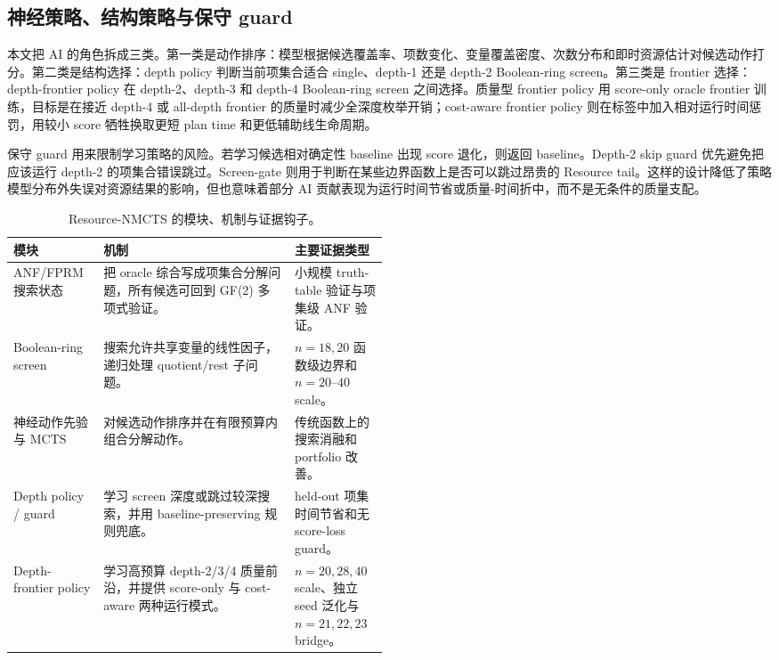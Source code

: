 \documentclass[UTF8,fontset=macnew,11pt]{ctexart}
\newcommand{\method}{Resource-NMCTS}
\newcommand{\screen}{Boolean-ring screen}
\newcommand{\mcts}{\ensuremath{\mathrm{MCTS}}}
\begin{document}
\subsection{神经策略、结构策略与保守 guard}

本文把 AI 的角色拆成三类。第一类是动作排序：模型根据候选覆盖率、项数变化、变量覆盖密度、次数分布和即时资源估计对候选动作打分。第二类是结构选择：depth policy 判断当前项集合适合 single、depth-1 还是 depth-2 \screen{}。第三类是 frontier 选择：depth-frontier policy 在 depth-2、depth-3 和 depth-4 \screen{} 之间选择。质量型 frontier policy 用 score-only oracle frontier 训练，目标是在接近 depth-4 或 all-depth frontier 的质量时减少全深度枚举开销；cost-aware frontier policy 则在标签中加入相对运行时间惩罚，用较小 score 牺牲换取更短 plan time 和更低辅助线生命周期。

保守 guard 用来限制学习策略的风险。若学习候选相对确定性 baseline 出现 score 退化，则返回 baseline。Depth-2 skip guard 优先避免把应该运行 depth-2 的项集合错误跳过。Screen-gate 则用于判断在某些边界函数上是否可以跳过昂贵的 Resource tail。这样的设计降低了策略模型分布外失误对资源结果的影响，但也意味着部分 AI 贡献表现为运行时间节省或质量-时间折中，而不是无条件的质量支配。

\begin{table}[H]
\centering
\small
\caption{\method{} 的模块、机制与证据钩子。}
\label{tab:modules-v27}
\begin{tabularx}{\linewidth}{>{\raggedright\arraybackslash}p{0.24\linewidth}>{\raggedright\arraybackslash}X>{\raggedright\arraybackslash}p{0.25\linewidth}}
\toprule
模块 & 机制 & 主要证据类型 \\
\midrule
ANF/FPRM 搜索状态 & 把 oracle 综合写成项集合分解问题，所有候选可回到 GF(2) 多项式验证。 & 小规模 truth-table 验证与项集级 ANF 验证。 \\
Boolean-ring screen & 搜索允许共享变量的线性因子，递归处理 quotient/rest 子问题。 & $n=18,20$ 函数级边界和 $n=20$--$40$ scale。 \\
神经动作先验与 \mcts{} & 对候选动作排序并在有限预算内组合分解动作。 & 传统函数上的搜索消融和 portfolio 改善。 \\
Depth policy / guard & 学习 screen 深度或跳过较深搜索，并用 baseline-preserving 规则兜底。 & held-out 项集时间节省和无 score-loss guard。 \\
Depth-frontier policy & 学习高预算 depth-2/3/4 质量前沿，并提供 score-only 与 cost-aware 两种运行模式。 & $n=20,28,40$ scale、独立 seed 泛化与 $n=21,22,23$ bridge。 \\
\bottomrule
\end{tabularx}
\end{table}
\end{document}
